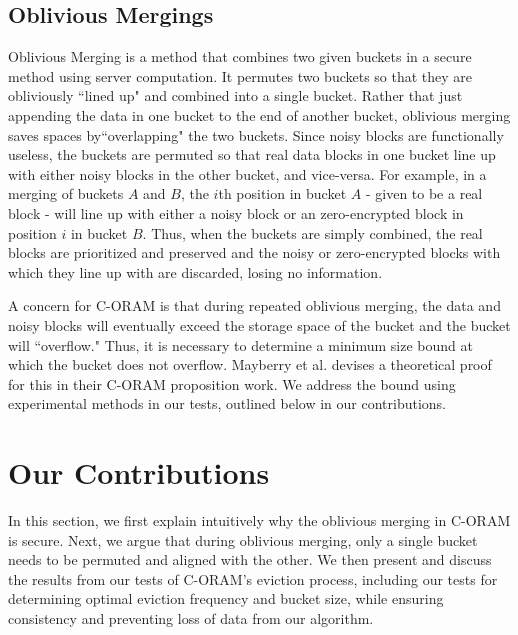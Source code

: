 \documentclass[12pt, oneside]{article}   	%
\begin{document}
\subsection{Oblivious Mergings}
Oblivious Merging is a method that combines two given buckets in a secure method using server computation. It permutes two buckets so that they are obliviously ``lined up" and combined into a single bucket. Rather that just appending the data in one bucket to the end of another bucket, oblivious merging saves spaces by``overlapping" the two buckets. Since noisy blocks are functionally useless, the buckets are permuted so that real data blocks in one bucket line up with either noisy blocks in the other bucket, and vice-versa. For example, in a merging of buckets $A$ and $B$, the $i$th position in bucket $A$ - given to be a real block - will line up with either a noisy block or an zero-encrypted block in position $i$ in bucket $B$. Thus, when the buckets are simply combined, the real blocks are prioritized and preserved and the noisy or zero-encrypted blocks with which they line up with are discarded, losing no information. 


A concern for C-ORAM is that during repeated oblivious merging, the data and noisy blocks will eventually exceed the storage space of the bucket and the bucket will ``overflow." Thus, it is necessary to determine a minimum size bound at which the bucket does not overflow. Mayberry et al. devises a theoretical proof for this in their C-ORAM proposition work. We address the bound using experimental methods in our tests, outlined below in our contributions.




\section{Our Contributions}

In this section, we first explain intuitively why the oblivious merging in C-ORAM is secure. Next, we argue that during oblivious merging, only a single bucket needs to be permuted and aligned with the other. We then present and discuss the results from our tests of C-ORAM's eviction process, including our tests for determining optimal eviction frequency and bucket size, while ensuring consistency and preventing loss of data from our algorithm.
\end{document}

